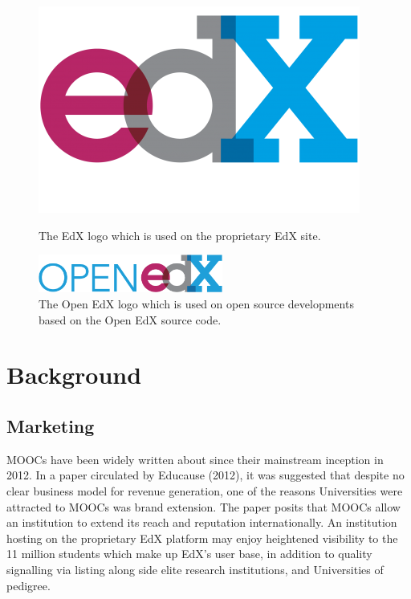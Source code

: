 \documentclass[a4paper]{article}
\begin{document}
\begin{figure}[h]
\centering
\begin{minipage}{0.45\linewidth}
\centering
\includegraphics[scale=0.18]{edx_logo}
\caption{The EdX logo which is used on the proprietary EdX site.}
\end{minipage}
\hspace{0.5cm}
\begin{minipage}{0.45\linewidth}
\centering
\includegraphics[height=1.25cm]{openedx-logo}
\caption{The Open EdX logo which is used on open source developments based on the Open EdX source code.}
\end{minipage}
\end{figure}


\section{Background}

\subsection{Marketing}
MOOCs have been widely written about since their mainstream inception in 2012. In a paper circulated by Educause (2012), it was suggested that despite no clear business model for revenue generation, one of the reasons Universities were attracted to MOOCs was brand extension. The paper posits that MOOCs allow an institution to extend its reach and reputation internationally. An institution hosting on the proprietary EdX platform may enjoy heightened visibility to the 11 million students which make up EdX's user base, in addition to quality signalling via listing along side elite research institutions, and Universities of pedigree.\\
\end{document}
